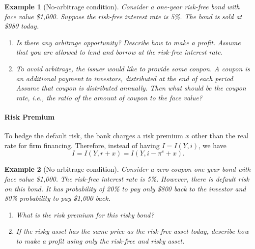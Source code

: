\documentclass[12pt]{article}
\newtheorem{example}{Example}
\begin{document}
\begin{example}[No-arbitrage condition]
    Consider a one-year risk-free bond with face value \$1,000. Suppose the risk-free interest rate is 5\%. The bond is sold at \$980 today.
    \begin{enumerate}[label=(\arabic*)]
        \item Is there any arbitrage opportunity? Describe how to make a profit. Assume that you are allowed to lend and borrow at the risk-free interest rate.
        \item To avoid arbitrage, the issuer would like to provide some coupon. A coupon is an additional payment to investors, distributed at the end of each period Assume that coupon is distributed annually. Then what should be the coupon rate, i.e., the ratio of the amount of coupon to the face value?
    \end{enumerate}
\end{example}


\paragraph{Risk Premium}
To hedge the default risk, the bank charges a risk premium $x$ other than the real rate for firm financing. Therefore, instead of having $I = I(Y,i)$, we have
\[ I = I (Y, r+x) = I(Y, i-\pi^e+x).\]

\begin{example}[No-arbitrage condition]
    Consider a zero-coupon one-year bond with face value \$1,000. The risk-free interest rate is 5\%. However, there is default risk on this bond. It has probability of 20\% to pay only \$800 back to the investor and 80\% probability to pay \$1,000 back. 
    \begin{enumerate}[label=(\arabic*)]
        \item What is the risk premium for this risky bond?
        \item If the risky asset has the same price as the risk-free asset today, describe how to make a profit using only the risk-free and risky asset.
    \end{enumerate}
\end{example}
\end{document}
